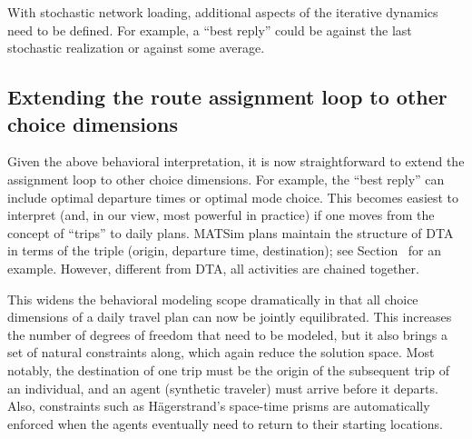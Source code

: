 With stochastic network loading, additional aspects
of the iterative dynamics need to be defined.  For example, a ``best
reply'' could be against the last stochastic realization or against
some average.



\subsection{Extending the route assignment loop to other choice dimensions}
\label{sec:extend-route-assignm}

Given the above behavioral interpretation, it is now straightforward
to extend the assignment loop to other choice dimensions.  For
example, the ``best reply'' can include optimal departure times
\citep[e.g.][]{METROPOLIS,EttemaEtcRoutes-timesIatbr03} or optimal mode
choice.  This becomes easiest to interpret (and, in our view, most
powerful in practice) if one moves from the concept of ``trips'' to
daily plans.
MATSim plans maintain the structure of DTA in terms of the triple
(origin, departure time, destination); see Section~ for an
example. However, different from DTA, all activities are chained together.

This widens the behavioral modeling scope dramatically in that all
choice dimensions of a daily travel plan can now be jointly
equilibrated. This increases the number of degrees of freedom that
need to be modeled, but it also brings a set of natural constraints
along, which again reduce the solution space. Most notably, the
destination of one trip must be the origin of the subsequent trip of
an individual, and an agent (synthetic traveler) must arrive before it departs.
Also, constraints such as H\"agerstrand's space-time prisms
\citep{Haegerstrand1970WhatAboutPeople} are
automatically enforced when the agents eventually need
to return to their starting locations.


